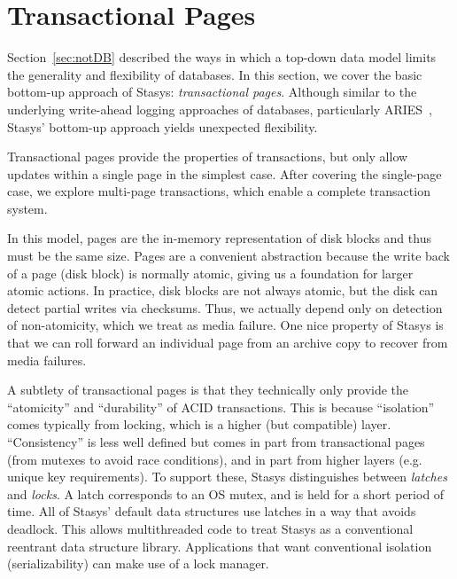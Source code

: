 \documentclass[letterpaper,twocolumn,10pt]{article}
\newcommand{\yad}{Stasys\xspace}
\newcommand{\yads}{Stasys'\xspace}
\begin{document}
\section{Transactional Pages}

Section~\ref{sec:notDB} described the ways in which a top-down data model
limits the generality and flexibility of databases.  In this section,
we cover the basic bottom-up approach of \yad: {\em transactional
pages}. Although similar to the underlying write-ahead logging
approaches of databases, particularly ARIES~\cite{aries}, \yads
bottom-up approach yields unexpected flexibility.

Transactional pages provide the properties of transactions, but
only allow updates within a single page in the simplest case.  After
covering the single-page case, we explore multi-page transactions,
which enable a complete transaction system.

In this model, pages are the in-memory representation of disk blocks
and thus must be the same size.  Pages are a convenient abstraction
because the write back of a page (disk block) is normally atomic,
giving us a foundation for larger atomic actions. In practice, disk
blocks are not always atomic, but the disk can detect partial writes
via checksums.  Thus, we actually depend only on detection of
non-atomicity, which we treat as media failure.  One nice property of
\yad is that we can roll forward an individual page from an archive copy to
recover from media failures.

A subtlety of transactional pages is that they technically only
provide the ``atomicity'' and ``durability'' of ACID
transactions.  This is because ``isolation'' comes typically from locking, which
is a higher (but compatible) layer. ``Consistency'' is less well defined
but comes in part from transactional pages (from mutexes to avoid race
conditions), and in part from higher layers (e.g. unique key
requirements). To support these, \yad distinguishes between {\em
latches} and {\em locks}.  A latch corresponds to an OS mutex, and is
held for a short period of time.  All of \yads default data structures
use latches in a way that avoids deadlock. This allows
multithreaded code to treat \yad as a conventional reentrant data structure
library.  Applications that want conventional isolation
(serializability) can make use of a lock manager.
\end{document}
